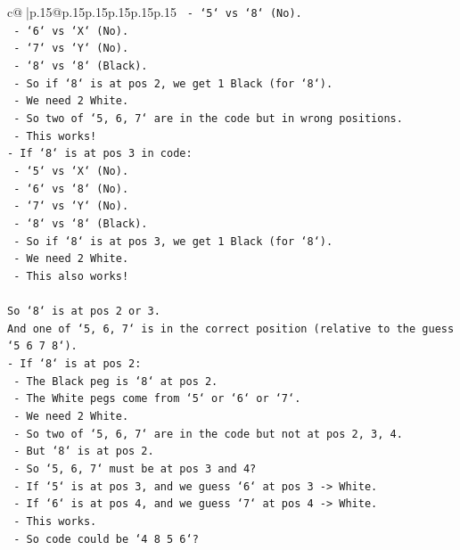 \documentclass{article}
\begin{document}
{\begin{supertabular}{c@{$\;$}|p{.15\linewidth}@{}p{.15\linewidth}p{.15\linewidth}p{.15\linewidth}p{.15\linewidth}p{.15\linewidth}}
{{{\texttt{    {-} `5` vs `8` (No).} \\
\texttt{    {-} `6` vs `X` (No).} \\
\texttt{    {-} `7` vs `Y` (No).} \\
\texttt{    {-} `8` vs `8` (Black).} \\
\texttt{    {-} So if `8` is at pos 2, we get 1 Black (for `8`).} \\
\texttt{    {-} We need 2 White.} \\
\texttt{    {-} So two of `5, 6, 7` are in the code but in wrong positions.} \\
\texttt{    {-} This works!} \\
\texttt{{-} If `8` is at pos 3 in code:} \\
\texttt{    {-} `5` vs `X` (No).} \\
\texttt{    {-} `6` vs `8` (No).} \\
\texttt{    {-} `7` vs `Y` (No).} \\
\texttt{    {-} `8` vs `8` (Black).} \\
\texttt{    {-} So if `8` is at pos 3, we get 1 Black (for `8`).} \\
\texttt{    {-} We need 2 White.} \\
\texttt{    {-} This also works!} \\
\\ 
\texttt{So `8` is at pos 2 or 3.} \\
\texttt{And one of `5, 6, 7` is in the correct position (relative to the guess `5 6 7 8`).} \\
\texttt{{-} If `8` is at pos 2:} \\
\texttt{    {-} The Black peg is `8` at pos 2.} \\
\texttt{    {-} The White pegs come from `5` or `6` or `7`.} \\
\texttt{    {-} We need 2 White.} \\
\texttt{    {-} So two of `5, 6, 7` are in the code but not at pos 2, 3, 4.} \\
\texttt{    {-} But `8` is at pos 2.} \\
\texttt{    {-} So `5, 6, 7` must be at pos 3 and 4?} \\
\texttt{    {-} If `5` is at pos 3, and we guess `6` at pos 3 {-}> White.} \\
\texttt{    {-} If `6` is at pos 4, and we guess `7` at pos 4 {-}> White.} \\
\texttt{    {-} This works.} \\
\texttt{    {-} So code could be `4 8 5 6`?} \\
}}}
\end{supertabular}}
\end{document}
